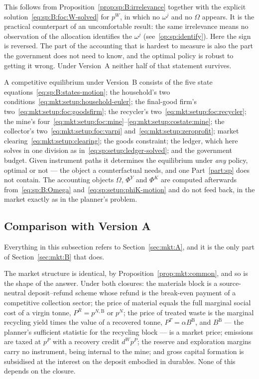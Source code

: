 This follows from Proposition~\ref{prop:sp:B:irrelevance} together with the explicit
solution~\eqref{eq:sp:B:foc:W-solved} for $p^W$, in which no $\omega^j$ and no $\Omega$ appears. It is
the practical counterpart of an uncomfortable result: the same irrelevance means no observation of the
allocation identifies the $\omega^j$ (see~\ref{op:sp:identify}). Here the sign is reversed. The part of
the accounting that is hardest to measure is also the part the government does not need to know, and
the optimal policy is robust to getting it wrong. Under Version~A neither half of that statement
survives.

 A competitive equilibrium under Version~B consists of the five state
equations~\eqref{eq:sp:B:states-motion}; the household's two
conditions~\eqref{eq:mkt:setup:household-euler}; the final-good firm's
two~\eqref{eq:mkt:setup:foc:goodsfirm}; the recycler's two~\eqref{eq:mkt:setup:foc:recycler}; the
mine's four~\eqref{eq:mkt:setup:foc:mine}--\eqref{eq:mkt:setup:costate:mine}; the collector's
two~\eqref{eq:mkt:setup:foc:varpi} and~\eqref{eq:mkt:setup:zeroprofit}; market
clearing~\eqref{eq:mkt:setup:clearing}; the goods constraint; the ledger, which here solves in one
division as in~\eqref{eq:sp:setup:ledger-solved}; and the government budget. Given instrument paths it
determines the equilibrium under \emph{any} policy, optimal or not --- the object a counterfactual
needs, and one Part~\ref{part:sp} does not contain. The accounting objects $\Omega$, $\Phi^Y$ and
$\Phi^K$ are computed afterwards from~\eqref{eq:sp:B:Omega} and~\eqref{eq:sp:setup:phiK-motion} and do
not feed back, in the market exactly as in the planner's problem.


\subsection{Comparison with Version A}\label{sec:mkt:B:compare}

Everything in this subsection refers to Section~\ref{sec:mkt:A}, and it is the only part of
Section~\ref{sec:mkt:B} that does.

 The market structure is identical, by
Proposition~\ref{prop:mkt:common}, and so is the shape of the answer. Under both closures: the
materials block is a source-neutral deposit--refund scheme whose refund is the break-even payment of a
competitive collection sector; the price of material equals the full marginal social cost of a virgin
tonne, $P^R=p^{N,\mathrm B}$ or $p^N$; the price of treated waste is the marginal recycling yield times
the value of a recovered tonne, $P^T=\alpha B^{\mathrm B}$, and $B^{\mathrm B}$ --- the planner's sufficient statistic for the
recycling block --- is a market price; emissions are taxed at $p^P$ with a recovery credit $d^Wp^P$;
the reserve and exploration margins carry no instrument, being internal to the mine; and gross capital
formation is subsidised at the interest on the deposit embodied in durables. None of this depends on
the closure.

